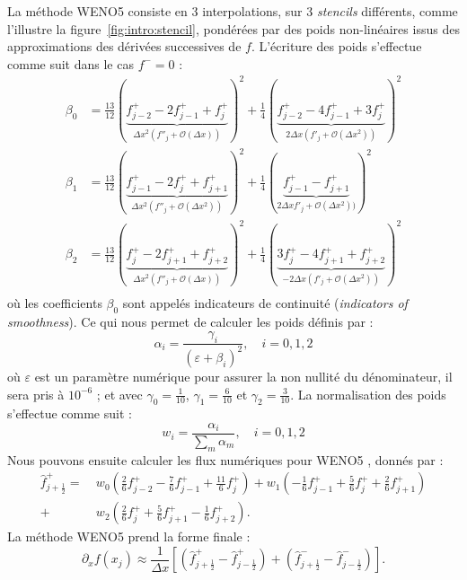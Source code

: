 La méthode WENO5 consiste en 3 interpolations, sur 3 \emph{stencils} différents, comme l'illustre la figure~\ref{fig:intro:stencil}, pondérées par des poids non-linéaires issus des approximations des dérivées successives de $f$. L'écriture des poids s'effectue comme suit dans le cas $f^-=0$ :
$$
  \begin{aligned}
    \beta_0 &= \frac{13}{12}( \underbrace{f^+_{j-2} - 2f^+_{j-1} + f^+_{j}}_{\Delta x^2(f''_{j} + \mathcal{O}(\Delta x))})^2   + \frac{1}{4}( \underbrace{  f^+_{j-2} - 4f^+_{j-1} + 3f^+_{j}  }_{ 2\Delta x ( f'_{j} + \mathcal{O}(\Delta x^2))})^2 \\
    \beta_1 &= \frac{13}{12}( \underbrace{f^+_{j-1} - 2f^+_{j}   + f^+_{j+1}}_{\Delta x^2(f''_{j} + \mathcal{O}(\Delta x^2))} )^2 + \frac{1}{4}( \underbrace{  f^+_{j-1} -               f^+_{j+1}}_{ 2\Delta x   f'_{j} + \mathcal{O}(\Delta x^2))})^2 \\
    \beta_2 &= \frac{13}{12}( \underbrace{f^+_{j}   - 2f^+_{j+1} + f^+_{j+2}}_{\Delta x^2(f''_{j} + \mathcal{O}(\Delta x))} )^2   + \frac{1}{4}( \underbrace{ 3f^+_{j}   - 4f^+_{j+1} +  f^+_{j+2}}_{-2\Delta x ( f'_{j} + \mathcal{O}(\Delta x^2))})^2 \\
  \end{aligned}
$$
où les coefficients $\beta_0$ sont appelés indicateurs de continuité (\emph{indicators of smoothness}). Ce qui nous permet de calculer les poids définis par :
$$
  \alpha_i = \frac{\gamma_i}{(\varepsilon + \beta_i)^2},\quad i=0,1,2
$$
où $\varepsilon$ est un paramètre numérique pour assurer la non nullité du dénominateur, il sera pris à $10^{-6}$ ; et avec $\gamma_0=\frac{1}{10}$, $\gamma_1=\frac{6}{10}$ et $\gamma_2=\frac{3}{10}$. La normalisation des poids s'effectue comme suit :
$$
  w_i = \frac{\alpha_i}{\sum_m \alpha_m},\quad i=0,1,2
$$
Nous pouvons ensuite calculer les flux numériques pour WENO5 \cite{Shu:2003}, donnés par :
$$
  \begin{aligned}
    \hat{f}_{j+\frac{1}{2}}^+   =\ & w_0\left(  \frac{2}{6}f^+_{j-2} - \frac{7}{6}f^+_{j-1} + \frac{11}{6}f^+_{j}   \right)
                                +    w_1\left( -\frac{1}{6}f^+_{j-1} + \frac{5}{6}f^+_{j}   +  \frac{2}{6}f^+_{j+1} \right) \\
                                +  & w_2\left(  \frac{2}{6}f^+_{j}   + \frac{5}{6}f^+_{j+1} -  \frac{1}{6}f^+_{j+2} \right).
  \end{aligned}
$$
La méthode WENO5 prend la forme finale :
$$
  \partial_xf(x_j) \approx \frac{1}{\Delta x}\left[ \left(\hat{f}_{j+\frac{1}{2}}^+ - \hat{f}_{j-\frac{1}{2}}^+ \right) + \left(\hat{f}_{j+\frac{1}{2}}^- - \hat{f}_{j-\frac{1}{2}}^- \right) \right].
$$

